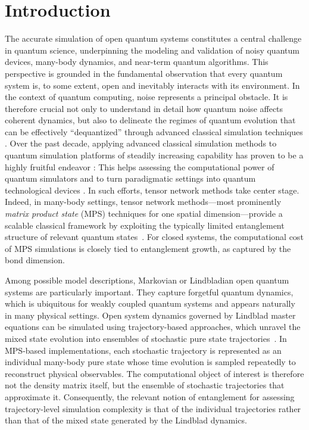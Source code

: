 \documentclass[aps, pra, superscriptaddress, reprint, floatfix]{revtex4-2}
\theoremstyle{plain}
\begin{document}
\maketitle

\section{Introduction}
The accurate simulation of open quantum systems constitutes a central challenge in quantum science, underpinning the modeling and validation of noisy quantum devices, many-body dynamics, and near-term quantum algorithms. This perspective is grounded in the fundamental observation that every quantum system is, to some extent, open and inevitably interacts with its environment.
In the context of quantum computing, noise represents a principal obstacle. It is therefore crucial not only to understand in detail how quantum noise affects coherent dynamics, but also to delineate the regimes of quantum evolution that can be effectively ``dequantized'' through 
advanced classical simulation techniques \cite{Zhou_2020}. Over the past decade, applying advanced classical simulation methods to quantum simulation platforms of steadily increasing capability has proven to be a highly fruitful endeavor \cite{Zhou_2020,PRXQuantum.5.010308,Trotzky}: This helps assessing the computational power of quantum simulators and to turn paradigmatic settings into quantum technological devices \cite{MindTheGaps}.
In such efforts, tensor network methods take center stage. Indeed, in many-body settings, tensor network methods---most prominently \emph{matrix product state} (MPS) techniques for one spatial dimension---provide a scalable classical 
framework by exploiting the typically limited entanglement structure of 
relevant quantum states~\cite{White1992, vidal_2004, Schollwock_2011,AreaReview,
RevModPhys.93.045003,Orus-AnnPhys-2014}. For closed systems, the computational cost of MPS simulations is closely tied to entanglement growth, as captured by the bond dimension.

Among possible model descriptions, Markovian or Lindbladian open quantum systems are particularly important. They capture forgetful quantum dynamics, which is ubiquitous for weakly
coupled quantum systems and appears naturally in many physical settings. Open system dynamics governed by Lindblad master equations can be simulated using trajectory-based approaches, which unravel the mixed state evolution into ensembles of stochastic pure state trajectories~\cite{Dalibard_1992, Molmer_92, Carmichael_1993, Wiseman_Milburn_2009}. In MPS-based implementations, each stochastic trajectory is represented as an individual many-body pure state whose time evolution is sampled repeatedly to reconstruct physical observables. The computational object of interest is therefore not the density matrix itself, but the ensemble of stochastic trajectories that approximate it. Consequently, the relevant notion of entanglement for assessing trajectory-level simulation complexity is that of the individual trajectories rather than that of the mixed state generated by the Lindblad dynamics.
\end{document}
